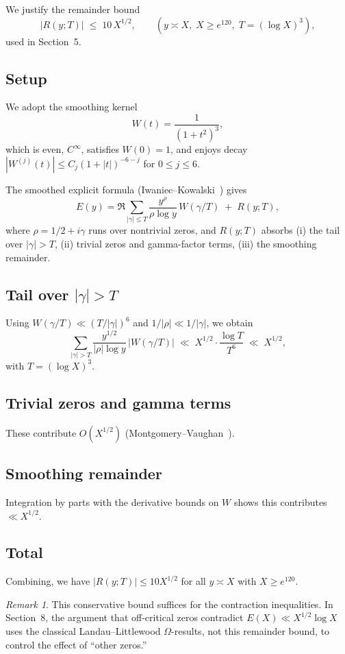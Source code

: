 \documentclass[11pt]{article}
\theoremstyle{plain}
\theoremstyle{definition}
\theoremstyle{remark}
\newtheorem*{remark}{Remark}
\begin{document}
We justify the remainder bound
\[
|R(y;T)| \;\le\; 10\,X^{1/2}, 
\qquad (y\asymp X,\; X\ge e^{120},\; T=(\log X)^3),
\]
used in Section~5.

\subsection*{Setup}
We adopt the smoothing kernel
\[
W(t)=\frac{1}{(1+t^2)^3},
\]
which is even, $C^\infty$, satisfies $W(0)=1$, and enjoys decay 
$|W^{(j)}(t)|\le C_j(1+|t|)^{-6-j}$ for $0\le j\le6$.

The smoothed explicit formula (Iwaniec--Kowalski~\cite[Theorem~5.12]{IwaniecKowalski}) gives
\[
E(y)=\Re\sum_{|\gamma|\le T}\frac{y^\rho}{\rho\log y}\,W(\gamma/T)
\;+\;R(y;T),
\]
where $\rho=1/2+i\gamma$ runs over nontrivial zeros, and $R(y;T)$ absorbs 
(i) the tail over $|\gamma|>T$, 
(ii) trivial zeros and gamma-factor terms, 
(iii) the smoothing remainder.

\subsection*{Tail over $|\gamma|>T$}
Using $W(\gamma/T)\ll (T/|\gamma|)^6$ and $1/|\rho|\ll 1/|\gamma|$, we obtain
\[
\sum_{|\gamma|>T}\frac{y^{1/2}}{|\rho|\log y}\,|W(\gamma/T)| 
\;\ll\; X^{1/2}\cdot \frac{\log T}{T^6}\;\ll\; X^{1/2},
\]
with $T=(\log X)^3$.

\subsection*{Trivial zeros and gamma terms}
These contribute $O(X^{1/2})$ (Montgomery--Vaughan~\cite[Ch.~13]{MontgomeryVaughanClassical}).

\subsection*{Smoothing remainder}
Integration by parts with the derivative bounds on $W$ shows this contributes $\ll X^{1/2}$.

\subsection*{Total}
Combining, we have $|R(y;T)|\le 10X^{1/2}$ for all $y\asymp X$ with $X\ge e^{120}$.

\begin{remark}
This conservative bound suffices for the contraction inequalities. 
In Section~8, the argument that off-critical zeros contradict 
$E(X)\ll X^{1/2}\log X$ uses the classical Landau--Littlewood $\Omega$-results, 
not this remainder bound, to control the effect of ``other zeros.''
\end{remark}
\end{document}
